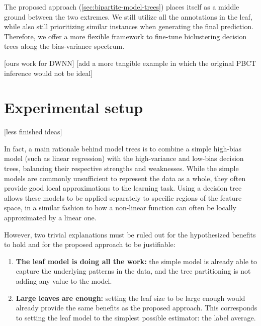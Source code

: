 \documentclass{article}
\begin{document}
The proposed approach (\autoref{sec:bipartite-model-trees}) places itself as a middle ground between the two extremes. We still utilize all the annotations in the leaf, while also still prioritizing similar instances when generating the final prediction. Therefore, we offer a more flexible framework to fine-tune biclustering decision trees along the bias-variance spectrum.

[ours work for DWNN]
[add a more tangible example in which the original PBCT inference would not be ideal]

\section{Experimental setup}
[less finished ideas]

In fact, a main rationale behind model trees is to combine a simple high-bias model (such as linear regression) with the high-variance and low-bias decision trees, balancing their respective strengths and weaknesses. While the simple models are commonly unsufficient to represent the data as a whole, they often provide good local approximations to the learning task. Using a decision tree allows these models to be applied separately to specific regions of the feature space, in a similar fashion to how a non-linear function can often be locally approximated by a linear one.


However, two trivial explanations must be ruled out for the hypothesized benefits to hold and for the proposed approach to be justifiable:
%
\begin{enumerate}
    \item \textbf{The leaf model is doing all the work:} the simple model is already able to capture the underlying patterns in the data, and the tree partitioning is not adding any value to the model.
    \item \textbf{Large leaves are enough:} setting the leaf size to be large enough would already provide the same benefits as the proposed approach. This corresponds to setting the leaf model to the simplest possible estimator: the label average.
\end{enumerate}
\end{document}
